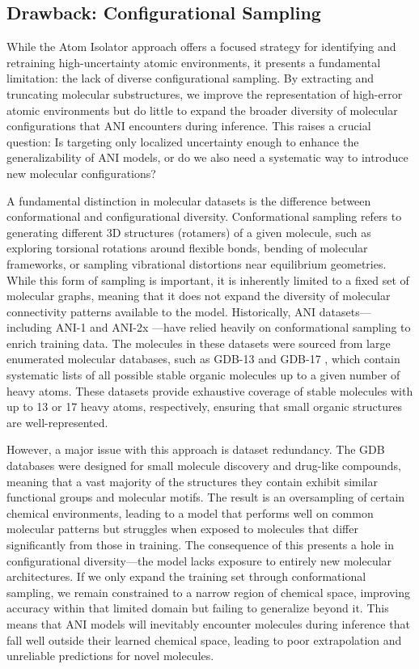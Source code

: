 \subsection{Drawback: Configurational Sampling}
\label{subsec:drawback_config_sampling}

While the Atom Isolator approach offers a focused strategy for identifying and retraining high-uncertainty atomic environments, it presents a fundamental limitation: the lack of diverse configurational sampling. By extracting and truncating molecular substructures, we improve the representation of high-error atomic environments but do little to expand the broader diversity of molecular configurations that ANI encounters during inference. This raises a crucial question: Is targeting only localized uncertainty enough to enhance the generalizability of ANI models, or do we also need a systematic way to introduce new molecular configurations?

A fundamental distinction in molecular datasets is the difference between conformational and configurational diversity. Conformational sampling refers to generating different 3D structures (rotamers) of a given molecule, such as exploring torsional rotations around flexible bonds, bending of molecular frameworks, or sampling vibrational distortions near equilibrium geometries. While this form of sampling is important, it is inherently limited to a fixed set of molecular graphs, meaning that it does not expand the diversity of molecular connectivity patterns available to the model. Historically, ANI datasets—including ANI-1 \cite{ani-1} and ANI-2x \cite{ani-2x}—have relied heavily on conformational sampling to enrich training data. The molecules in these datasets were sourced from large enumerated molecular databases, such as GDB-13 \cite{gdb-13} and GDB-17 \cite{gdb-17}, which contain systematic lists of all possible stable organic molecules up to a given number of heavy atoms. These datasets provide exhaustive coverage of stable molecules with up to 13 or 17 heavy atoms, respectively, ensuring that small organic structures are well-represented.

However, a major issue with this approach is dataset redundancy. The GDB databases were designed for small molecule discovery and drug-like compounds, meaning that a vast majority of the structures they contain exhibit similar functional groups and molecular motifs. The result is an oversampling of certain chemical environments, leading to a model that performs well on common molecular patterns but struggles when exposed to molecules that differ significantly from those in training. The consequence of this presents a hole in configurational diversity—the model lacks exposure to entirely new molecular architectures. If we only expand the training set through conformational sampling, we remain constrained to a narrow region of chemical space, improving accuracy within that limited domain but failing to generalize beyond it. This means that ANI models will inevitably encounter molecules during inference that fall well outside their learned chemical space, leading to poor extrapolation and unreliable predictions for novel molecules.

